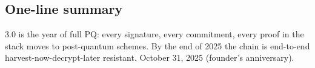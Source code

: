 \subsection{One-line summary}

\Zoo{} 3.0 is the year of full PQ: every signature, every commitment,
every proof in the \Zoo{} stack moves to post-quantum schemes. By
the end of 2025 the chain is end-to-end harvest-now-decrypt-later
resistant. October 31, 2025 (founder's anniversary).
